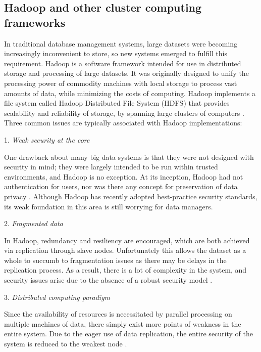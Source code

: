 \documentclass{sigchi}
\begin{document}
\subsection{Hadoop and other cluster computing frameworks}

In traditional database management systems, large datasets were becoming increasingly inconvenient to store, so new systems emerged to fulfill this requirement\cite{franklin2005databases}. Hadoop is a software framework intended for use in distributed storage and processing of large datasets\cite{white2012hadoop}. It was originally designed to unify the processing power of commodity machines with local storage to process vast amounts of data, while minimizing the costs of computing. Hadoop implements a file system called Hadoop Distributed File System (HDFS) that provides scalability and reliability of storage, by spanning large clusters of computers \cite{borthakur2008hdfs}. Three common issues are typically associated with Hadoop implementations:

1. \textit{Weak security at the core}

One drawback about many big data systems is that they were not designed with security in mind; they were largely intended to be run within trusted environments, and Hadoop is no exception. At its inception, Hadoop had not authentication for users, nor was there any concept for preservation of data privacy \cite{lublinsky2013professional}.  Although Hadoop has recently adopted best-practice security standards, its weak foundation in this area is still worrying for data managers.

2. \textit{Fragmented data}

In Hadoop, redundancy and resiliency are encouraged, which are both achieved via replication through slave nodes. Unfortunately this allows the dataset as a whole to succumb to fragmentation issues as there may be delays in the replication process. As a result, there is a lot of complexity in the system, and security issues arise due to the absence of a robust security model \cite{sharma2014securing}.

3. \textit{Distributed computing paradigm}

Since the availability of resources is necessitated by parallel processing on multiple machines of data, there simply exist more points of weakness in the entire system. Due to the eager use of data replication, the entire security of the system is reduced to the weakest node \cite{sharma2014securing}.
\end{document}
